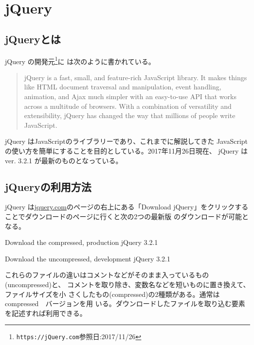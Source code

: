 \chapter{jQuery}
\section{jQueryとは}
jQuery の開発元\footnote{\texttt{https://jQuery.com}参照日:2017/11/26}に
は次のように書かれている。
\begin{quotation}
jQuery is a fast, small, and feature-rich JavaScript library. It makes
 things like HTML document traversal and manipulation, event handling,
 animation, and Ajax much simpler with an easy-to-use API that works
 across a multitude of browsers. With a combination of versatility and
 extensibility, jQuery has changed the way that millions of people write
 JavaScript.
 \end{quotation}
jQuery はJavaScriptのライブラリーであり、これまでに解説してきた
JavaScriptの使い方を簡単にすることを目的としている。2017年11月26日現在、
jQuery は ver. 3.2.1 が最新のものとなっている。

\section{jQueryの利用方法}
jQuery は\href{jquery.com}{jquery.com}のページの右上にある「Download
jQuery」をクリックすることでダウンロードのページに行くと次の2つの最新版
のダウンロードが可能となる。

Download the compressed, production jQuery 3.2.1

Download the uncompressed, development jQuery 3.2.1

これらのファイルの違いはコメントなどがそのまま入っているもの(uncompressed)と、
コメントを取り除き、変数名などを短いものに置き換えて、ファイルサイズを小
さくしたもの(compressed)の2種類がある。通常は compressed　バージョンを用
いる。ダウンロードしたファイルを取り込む要素を記述すれば利用できる。

